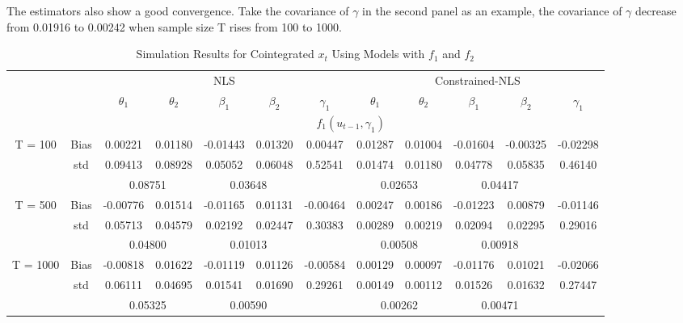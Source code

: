 \documentclass[a4paper,12pt,times,numbered,print,index]{report}
\numberwithin{equation}{section}
\begin{document}
The estimators also show a good convergence. Take the covariance of $\gamma$ in the second panel as an example, the covariance of $\gamma$ decrease from 0.01916 to 0.00242 when sample size T rises from 100 to 1000. 
\begin{table}[htbp]
  \centering
  \caption{Simulation Results for Cointegrated $x_t$ Using Models with $f_1$ and $f_2$}
    \begin{adjustbox}{max width=\textwidth}
    \begin{tabular}{cccccccccccc}
    \toprule
          &       & \multicolumn{5}{c}{NLS}               & \multicolumn{5}{c}{Constrained-NLS} \\
          &       & $\theta_1$ & $\theta_2$ & $\beta_1$ & $\beta_2$ & $\gamma_1$ & $\theta_1$ & $\theta_2$ & $\beta_1$ & $\beta_2$ & $\gamma_1$ \\
    \midrule
    &       & \multicolumn{10}{c}{$f_1 (u_{t-1}, \gamma_1)$}                \\
    \midrule
    \multirow{3}[1]{*}{T = 100} & Bias  & 0.00221 & 0.01180 & -0.01443 & 0.01320 & 0.00447 & 0.01287 & 0.01004 & -0.01604 & -0.00325 & -0.02298 \\
          & std   & 0.09413 & 0.08928 & 0.05052 & 0.06048 & 0.52541 & 0.01474 & 0.01180 & 0.04778 & 0.05835 & 0.46140 \\
          &       & \multicolumn{2}{c}{0.08751} & \multicolumn{2}{c}{0.03648} &       & \multicolumn{2}{c}{0.02653} & \multicolumn{2}{c}{0.04417} &  \\
    \multirow{3}[0]{*}{T = 500} & Bias  & -0.00776 & 0.01514 & -0.01165 & 0.01131 & -0.00464 & 0.00247 & 0.00186 & -0.01223 & 0.00879 & -0.01146 \\
          & std   & 0.05713 & 0.04579 & 0.02192 & 0.02447 & 0.30383 & 0.00289 & 0.00219 & 0.02094 & 0.02295 & 0.29016 \\
          &       & \multicolumn{2}{c}{0.04800} & \multicolumn{2}{c}{0.01013} &       & \multicolumn{2}{c}{0.00508} & \multicolumn{2}{c}{0.00918} &  \\
    \multirow{3}[1]{*}{T = 1000} & Bias  & \textcolor[rgb]{ 0,  .439,  .753}{-0.00818} & 0.01622 & -0.01119 & 0.01126 & -0.00584 & \textcolor[rgb]{ 0,  .439,  .753}{0.00129} & 0.00097 & -0.01176 & 0.01021 & -0.02066 \\
          & std   & 0.06111 & 0.04695 & 0.01541 & 0.01690 & 0.29261 & 0.00149 & 0.00112 & 0.01526 & 0.01632 & 0.27447 \\
          &       & \multicolumn{2}{c}{0.05325} & \multicolumn{2}{c}{0.00590} &       & \multicolumn{2}{c}{0.00262} & \multicolumn{2}{c}{0.00471} &  \\

\end{tabular}
\end{adjustbox}
\end{table}
\end{document}
